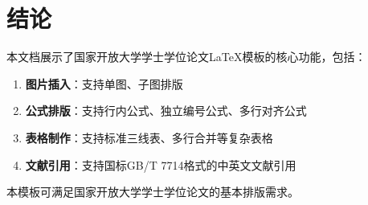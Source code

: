 
\section{结论}

本文档展示了国家开放大学学士学位论文LaTeX模板的核心功能，包括：

\begin{enumerate}
    \item \textbf{图片插入}：支持单图、子图排版
    \item \textbf{公式排版}：支持行内公式、独立编号公式、多行对齐公式
    \item \textbf{表格制作}：支持标准三线表、多行合并等复杂表格
    \item \textbf{文献引用}：支持国标GB/T 7714格式的中英文文献引用
\end{enumerate}

本模板可满足国家开放大学学士学位论文的基本排版需求。
